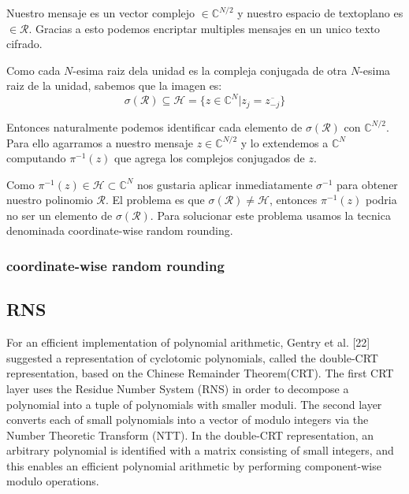 \documentclass[12pt, oneside]{article}
\newcommand{\Hc}{\mathcal{H}}
\newcommand{\Rc}{\mathcal{R}}
\newcommand{\C}{\mathbb{C}}
\begin{document}
Nuestro mensaje es un vector complejo $\in\C^{N/2}$ y nuestro espacio de textoplano
es $\in\Rc$.
Gracias a esto podemos encriptar multiples mensajes en un unico texto cifrado.

Como cada $N$-esima raiz dela unidad es la compleja conjugada de otra
$N$-esima raiz de la unidad, sabemos que la imagen es:
\begin{equation*}
\sigma(\Rc)\subseteq\Hc=\{z\in\C^N|z_j=\overline{z_{-j}}\}
\end{equation*}

Entonces naturalmente podemos identificar cada elemento de $\sigma(\Rc)$ con $\C^{N/2}$.
Para ello agarramos a nuestro mensaje $z\in\C^{N/2}$ y lo extendemos a $\C^N$ computando
$\pi^{-1}(z)$ que agrega los complejos conjugados de $z$.

Como $\pi^{-1}(z)\in\Hc\subset\C^N$ nos gustaria aplicar inmediatamente $\sigma^{-1}$ para obtener nuestro
polinomio $\Rc$.
El problema es que $\sigma(\Rc)\neq\Hc$, entonces $\pi^{-1}(z)$ podria no ser un elemento de
$\sigma(\Rc)$.
Para solucionar este problema usamos la tecnica denominada coordinate-wise random rounding.
\subsubsection*{coordinate-wise random rounding}

\subsection{RNS}
For an efficient implementation of polynomial arithmetic, Gentry et al. [22]
suggested a representation of cyclotomic polynomials, called the double-CRT representation,
based on the Chinese Remainder Theorem(CRT).
The first CRT layer uses the Residue Number System (RNS) in order to decompose a
polynomial into a tuple of polynomials with smaller moduli.
The second layer converts each of small polynomials into a vector of modulo integers
via the Number Theoretic Transform (NTT).
In the double-CRT representation, an arbitrary polynomial is identified with a
matrix consisting of small integers, and this enables an efficient polynomial arithmetic
by performing component-wise modulo operations.
\end{document}
